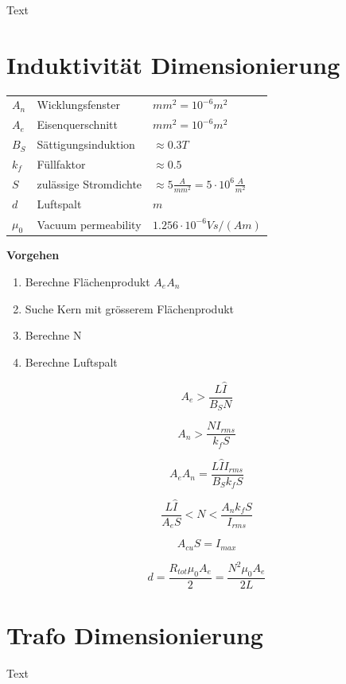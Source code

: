 \documentclass[10pt,landscape]{scrartcl}
\newcommand{\eqn}[3]
{
  \begin{minipage}[#1]{#2}
    \[ #3 \]
  \end{minipage}
}
\begin{document}
\begin{multicols}{2}
Text

\vfill\null
\columnbreak
\section{Induktivität Dimensionierung}

\begin{minipage}[h]{0.6\linewidth}
  \begin{tabular}{l l l |}
    $A_n$   & Wicklungsfenster      & $mm^2 = 10^{-6}m^2$ \\
    $A_e$   & Eisenquerschnitt      & $mm^2 = 10^{-6}m^2$ \\
    $B_S$   & Sättigungsinduktion   & $\approx 0.3T$ \\
    $k_f$   & Füllfaktor            & $\approx 0.5$ \\
    $S$     & zulässige Stromdichte & $\approx 5\frac{A}{mm^2}=5\cdot10^6\frac{A}{m^2}$ \\
    $d$     & Luftspalt             & $m$ \\
    $\mu_0$ & Vacuum permeability   & $1.256\cdot10^{-6}Vs/(Am)$
  \end{tabular}
\end{minipage}
\begin{minipage}[h]{0.3\linewidth}
\textbf{Vorgehen}
  \begin{enumerate}
    \item Berechne Flächenprodukt $A_e A_n$
    \item Suche Kern mit grösserem Flächenprodukt
    \item Berechne N
    \item Berechne Luftspalt
  \end{enumerate}
\end{minipage}


\eqn{h}{0.23\linewidth}{ A_e > \frac{L\hat{I}}{B_S N} }
\eqn{h}{0.23\linewidth}{ A_n > \frac{NI_{rms}}{k_f S} }
\eqn{h}{0.23\linewidth}{ A_e A_n = \frac{L \hat{I} I_{rms}}{B_S k_f S} }
\eqn{h}{0.23\linewidth}{ \frac{L \hat{I} }{A_e S} < N < \frac{A_n k_f S}{I_{rms}} }

\eqn{h}{0.23\linewidth}{ A_{cu} S = I_{max} }
\eqn{h}{0.23\linewidth}{ d = \frac{R_{tot}\mu_0 A_e}{2} = \frac{N^2 \mu_0 A_e}{2L} }


\vfill\null
\columnbreak
\section{Trafo Dimensionierung}
Text


\end{multicols}
\end{document}
